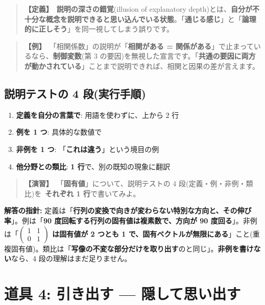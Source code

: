 \documentclass{article}
\begin{document}
\begin{quote}
\textbf{【定義】}\ \textbf{説明の深さの錯覚}(illusion of explanatory depth)とは、\textbf{自分が不十分な概念を説明できると思い込んでいる状態}。「\textbf{通じる感じ}」と「\textbf{論理的に正しそう}」を同一視してしまう誤りです。
\end{quote}

\begin{quote}
\textbf{【例】}\ 「相関係数」の説明が「\textbf{相関がある = 関係がある}」で止まっているなら、\textbf{制御変数}(第 3 の要因)を無視した宣言です。「\textbf{共通の要因に両方が動かされている}」ことまで説明できれば、相関と因果の差が言えます。
\end{quote}

\subsection{説明テストの 4 段(実行手順)}

\begin{enumerate}
\item \textbf{定義を自分の言葉で}: 用語を使わずに、上から 2 行
\item \textbf{例を 1 つ}: 具体的な数値で
\item \textbf{非例を 1 つ}: 「\textbf{これは違う}」という境目の例
\item \textbf{他分野との類比}: \textbf{1 行}で、別の既知の現象に翻訳
\end{enumerate}

\begin{quote}
\textbf{【演習】}\ 「\textbf{固有値}」について、説明テストの 4 段(定義・例・非例・類比)を\ \textbf{それぞれ 1 行}で書いてみよ。
\end{quote}

\textbf{解答の指針:} 定義は「\textbf{行列の変換で向きが変わらない特別な方向と、その伸び率}」。例は「\textbf{90 度回転する行列の固有値は複素数で、方向が 90 度回る}」。非例は「\textbf{\(\begin{pmatrix} 1 & 1 \\ 0 & 1 \end{pmatrix}\) は固有値が 2 つとも 1 で、固有ベクトルが無限にある}」こと(重複固有値)。類比は「\textbf{写像の不変な部分だけを取り出す}のと同じ」。\textbf{非例を書けない}なら、4 段の理解はまだ足りません。

\section{道具 4: 引き出す — 隠して思い出す}
\end{document}
